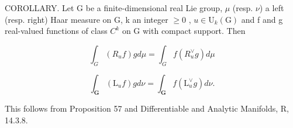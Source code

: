 COROLLARY. Let G be a finite-dimensional real Lie group, \(\mu\) (resp. \(\nu\)) a left (resp. right) Haar measure on G, k an integer \(\geqslant0\) , \(u\in\mathrm{U}_{k}(\mathrm{G})\) and f and g real-valued functions of class \(C^{k}\) on G with compact support. Then

\[
\int_ {G} \left(R _ {u} f\right) g d \mu = \int_ {G} f (R _ {u} ^ {\vee} g) d \mu
\]

\[
\int_ {\mathbf {G}} \left(\mathrm{L} _ {u} f\right) g d \nu = \int_ {\mathbf {G}} f (\mathrm{L} _ {u} ^ {\vee} g) d \nu .
\]

This follows from Proposition 57 and Differentiable and Analytic Manifolds, R, 14.3.8.

